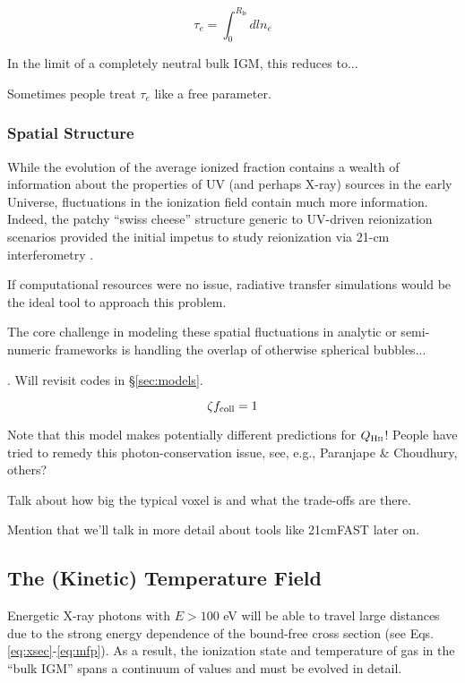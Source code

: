 \begin{equation}
	\tau_e = \int_0^{R_{\mathrm{ls}}} dl n_e
\end{equation}

In the limit of a completely neutral bulk IGM, this reduces to...


Sometimes people treat $\tau_e$ like a free parameter. 

\subsubsection{Spatial Structure} \label{sec:ionization_local}
While the evolution of the average ionized fraction contains a wealth of information about the properties of UV (and perhaps X-ray) sources in the early Universe, fluctuations in the ionization field contain much more information. Indeed, the patchy ``swiss cheese'' structure generic to UV-driven reionization scenarios provided the initial impetus to study reionization via 21-cm interferometry \cite{Madau1997}.

If computational resources were no issue, radiative transfer simulations would be the ideal tool to approach this problem. 

The core challenge in modeling these spatial fluctuations in analytic or semi-numeric frameworks is handling the overlap of otherwise spherical bubbles...

\cite{Furlanetto2004}. Will revisit codes in \S\ref{sec:models}.

\begin{equation}
	\zeta f_{\text{coll}} = 1
\end{equation}


Note that this model makes potentially different predictions for $Q_{\text{H} {\textsc{ii}}}$! People have tried to remedy this photon-conservation issue, see, e.g., Paranjape \& Choudhury, others?


Talk about how big the typical voxel is and what the trade-offs are there.


Mention that we'll talk in more detail about tools like 21cmFAST later on.


\subsection{The (Kinetic) Temperature Field}
Energetic X-ray photons with $E > 100$ eV will be able to travel large distances due to the strong energy dependence of the bound-free cross section (see Eqs. \ref{eq:xsec}-\ref{eq:mfp}). As a result, the ionization state and temperature of gas in the ``bulk IGM'' spans a continuum of values and must be evolved in detail. 

